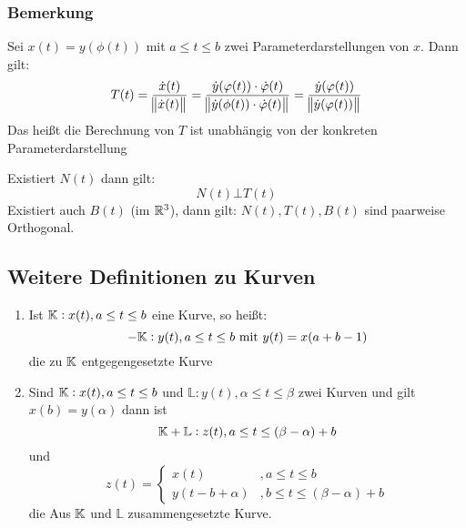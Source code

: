 \subsubsection{Bemerkung}
Sei $x(t) = y(\phi(t))$ mit $a\leq t \leq b$ zwei Parameterdarstellungen von $x$.
Dann gilt:
\begin{equation*}
    T(t) = \frac{\dot{x}(t)}{\norm{\dot{x}(t)}} = \frac{\dot{y}(\varphi(t)) \cdot \dot{\varphi}(t)}
    {\norm{\dot{y}(\phi(t)) \cdot \dot{\varphi}(t)}} = \frac{\dot{y}(\varphi(t))}
    {\norm{\dot{y}(\varphi(t))}}
\end{equation*}
Das heißt die Berechnung von $T$ ist unabhängig von der konkreten Parameterdarstellung

Existiert $N(t)$ dann gilt:
\begin{equation*}
    N(t) \bot T(t)
\end{equation*}
Existiert auch $B(t)$ (im $\mathbb{R}^3$), dann gilt:
$N(t), T(t), B(t)$ sind paarweise Orthogonal.

\subsection{Weitere Definitionen zu Kurven}
\begin{enumerate}[label= (\alph*)]
    \item Ist $\mathbb{K}: x(t), a \leq t \leq b$ eine Kurve, so heißt:
        \begin{equation*}
            - \mathbb{K}: y(t), a \leq t \leq b \text{ mit } y(t)=x(a+b-1)
        \end{equation*}
        die zu $\mathbb{K}$ entgegengesetzte Kurve
    \item Sind $\mathbb{K}: x(t), a \leq t \leq b$ und $\mathbb{L}: y(t), \alpha \leq
        t \leq \beta$ zwei Kurven und gilt $x(b) = y(\alpha)$ dann ist
        \begin{equation*}
            \mathbb{K} + \mathbb{L}: z(t), a \leq t \leq (\beta-\alpha) + b
        \end{equation*}
        und
        \begin{equation*}
            z(t) =
            \begin{cases}
                x(t) &, a \leq t \leq b\\
                y(t-b+\alpha) &, b \leq t \leq (\beta-\alpha) + b
            \end{cases}
        \end{equation*}
        die Aus $\mathbb{K}$ und $\mathbb{L}$ zusammengesetzte Kurve.
\end{enumerate}

